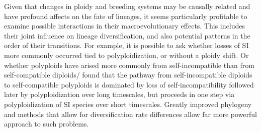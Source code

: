 Given that changes in ploidy and breeding systems may be causally related and have profound affects on the fate of lineages, it seems particularly profitable to examine possible interactions in their macroevolutionary effects.
This includes their joint influence on lineage diversification, and also potential patterns in the order of their transitions.
For example, it is possible to ask whether losses of  SI more commonly occurred tied to polyploidization, or without a ploidy shift. Or whether polyploids have arised more commonly from self-incompatible than from self-compatible diploids/
 found that the pathway from self-incompatible diploids to self-compatible polyploids is dominated by loss of self-incompatibility followed later by polyploidization over long timescales, but proceeds in one step via polyploidization of SI species over short timescales.
Greatly improved phylogeny and methods that allow for diversification rate differences allow far more powerful approach to such problems. %

